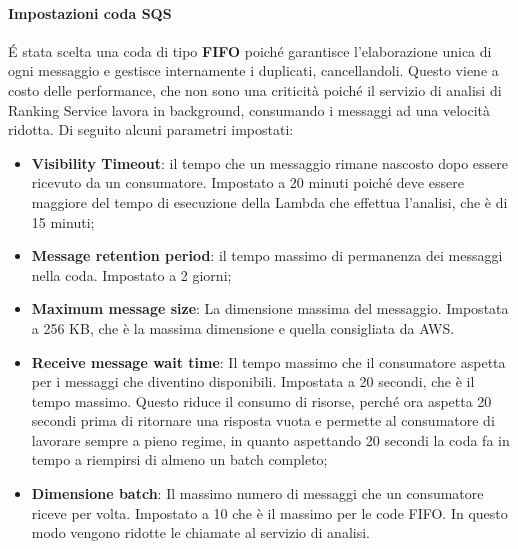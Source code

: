 \paragraph{Impostazioni coda SQS}
\'E stata scelta una coda di tipo \textbf{FIFO} poiché garantisce l'elaborazione unica di ogni messaggio e gestisce internamente i duplicati, cancellandoli. Questo viene a costo delle performance, che non sono una criticità poiché il servizio di analisi di Ranking Service lavora in background, consumando i messaggi ad una velocità ridotta.
Di seguito alcuni parametri impostati:
\begin{itemize}
\item \textbf{Visibility Timeout}: il tempo che un messaggio rimane nascosto dopo essere ricevuto da un consumatore. Impostato a 20 minuti poiché deve essere maggiore del tempo di esecuzione della Lambda che effettua l'analisi, che è di 15 minuti;
\item \textbf{Message retention period}: il tempo massimo di permanenza dei messaggi nella coda. Impostato a 2 giorni;
\item \textbf{Maximum message size}: La dimensione massima del messaggio. Impostata a 256 KB, che è la massima dimensione e quella consigliata da AWS.
\item \textbf{Receive message wait time}: Il tempo massimo che il consumatore aspetta per i messaggi che diventino disponibili. Impostata a 20 secondi, che è il tempo massimo. Questo riduce il consumo di risorse, perché ora aspetta 20 secondi prima di ritornare una risposta vuota e permette al consumatore di lavorare sempre a pieno regime, in quanto aspettando 20 secondi la coda fa in tempo a riempirsi di almeno un batch completo;
\item \textbf{Dimensione batch}: Il massimo numero di messaggi che un consumatore riceve per volta. Impostato a 10 che è il massimo per le code FIFO. In questo modo vengono ridotte le chiamate al servizio di analisi.
\end{itemize}

